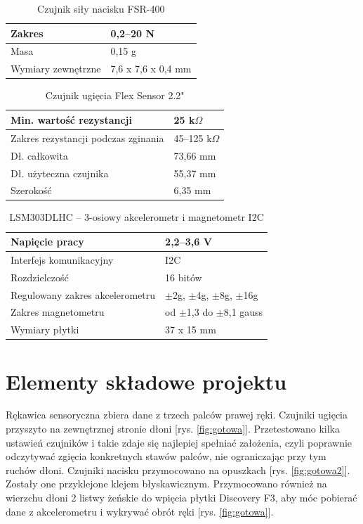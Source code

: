 \documentclass[12pt,a4paper]{article}
\begin{document}
\begin{table}[h]
\centering
\begin{tabularx}
{\textwidth}{ |X|X| }
\hline
Zakres & 0,2--20 N \\
\hline
Masa & 0,15 g \\ 
\hline
Wymiary zewnętrzne & 7,6 x 7,6 x 0,4 mm \\
\hline
\end{tabularx}
\caption{Czujnik siły nacisku FSR-400}
\end{table}


\begin{table}[h]
\centering
\begin{tabularx}
{\textwidth}{ |X|X| }
\hline
Min. wartość rezystancji & 25 k$\Omega$ \\
\hline
Zakres rezystancji podczas zginania & 45--125 k$\Omega$ \\
\hline
Dł. całkowita & 73,66 mm \\
\hline
Dł. użyteczna czujnika & 55,37 mm \\ 
\hline
Szerokość & 6,35 mm \\
\hline
\end{tabularx}
\caption{Czujnik ugięcia Flex Sensor 2.2"}
\end{table}


\begin{table}[h]
\centering
\begin{tabularx}
{\textwidth}{ |X|X| }
\hline
Napięcie pracy & 2,2--3,6 V \\
\hline
Interfejs komunikacyjny & I2C \\
\hline
Rozdzielczość & 16 bitów \\
\hline
Regulowany zakres akcelerometru &  $\pm$2g, $\pm$4g, $\pm$8g, $\pm$16g \\ 
\hline
Zakres magnetometru &  od $\pm$1,3 do $\pm$8,1 gauss \\ 
\hline
Wymiary płytki & 37 x 15 mm \\
\hline
\end{tabularx}
\caption{LSM303DLHC -- 3-osiowy akcelerometr i magnetometr I2C}
\end{table}

\section{Elementy składowe projektu}
Rękawica sensoryczna zbiera dane z trzech palców prawej ręki. Czujniki ugięcia przyszyto na zewnętrznej stronie dłoni [rys. \ref{fig:gotowa}].
 Przetestowano kilka ustawień czujników i takie zdaje się najlepiej spełniać założenia, czyli poprawnie odczytywać zgięcia konkretnych stawów palców, nie ograniczając przy tym ruchów dłoni. Czujniki nacisku przymocowano na opuszkach [rys. \ref{fig:gotowa2}]. Zostały one przyklejone klejem błyskawicznym. Przymocowano również na wierzchu dłoni 2 listwy żeńskie do wpięcia płytki Discovery F3, aby móc pobierać dane z akcelerometru i wykrywać obrót ręki [rys. \ref{fig:gotowa}].
 
\end{document}
